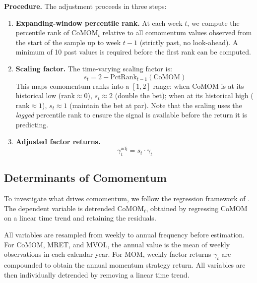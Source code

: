 \documentclass[10pt]{article}
\begin{document}
\textbf{Procedure.} The adjustment proceeds in three steps:
\begin{enumerate}[nosep]
    \item \textbf{Expanding-window percentile rank.} At each week $t$, we compute the percentile rank of $\text{CoMOM}_t$ relative to all comomentum values observed from the start of the sample up to week $t-1$ (strictly past, no look-ahead). A minimum of 10 past values is required before the first rank can be computed.
    \item \textbf{Scaling factor.} The time-varying scaling factor is:
    \begin{equation}
        s_t = 2 - \text{PctRank}_{t-1}(\text{CoMOM})
    \end{equation}
    This maps comomentum ranks into a $[1, 2]$ range: when $\text{CoMOM}$ is at its historical low ($\text{rank} \approx 0$), $s_t \approx 2$ (double the bet); when at its historical high ($\text{rank} \approx 1$), $s_t \approx 1$ (maintain the bet at par). Note that the scaling uses the \emph{lagged} percentile rank to ensure the signal is available before the return it is predicting.
    \item \textbf{Adjusted factor returns.}
    \begin{equation}
        \gamma^{\text{adj}}_t = s_t \cdot \gamma_t
    \end{equation}
\end{enumerate}


\subsection{Determinants of Comomentum}
\label{sec:determinants-methodology}

To investigate what drives comomentum, we follow the regression framework of \citet[Table~II]{LouPolk2021}. The dependent variable is detrended $\text{CoMOM}_t$, obtained by regressing $\text{CoMOM}$ on a linear time trend and retaining the residuals.

All variables are resampled from weekly to annual frequency before estimation. For CoMOM, MRET, and MVOL, the annual value is the mean of weekly observations in each calendar year. For MOM, weekly factor returns $\gamma_t$ are compounded to obtain the annual momentum strategy return. All variables are then individually detrended by removing a linear time trend.
\end{document}
